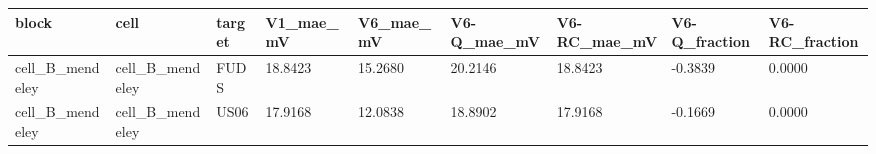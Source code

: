 \begin{tabular}{lllllllll}
\hline
block & cell & target & V1\_mae\_mV & V6\_mae\_mV & V6-Q\_mae\_mV & V6-RC\_mae\_mV & V6-Q\_fraction & V6-RC\_fraction \\
\hline
cell\_B\_mendeley & cell\_B\_mendeley & FUDS & 18.8423 & 15.2680 & 20.2146 & 18.8423 & -0.3839 & 0.0000 \\
cell\_B\_mendeley & cell\_B\_mendeley & US06 & 17.9168 & 12.0838 & 18.8902 & 17.9168 & -0.1669 & 0.0000 \\
\hline
\end{tabular}
